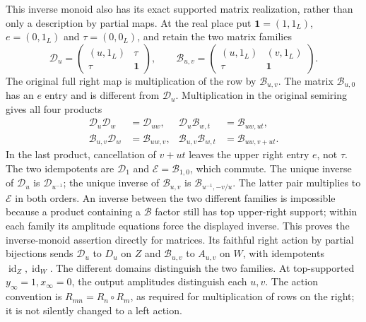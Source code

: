 This inverse monoid also has its exact supported matrix
realization, rather than only a description by partial maps.
At the real place put $\mathbf1=(1,1_L)$,
$e=(0,1_L)$ and $\tau=(0,0_L)$, and retain the two matrix families
\begin{equation}\tag{SAP18a}
\mathcal D_u=
\begin{pmatrix}(u,1_L)&\tau\\ \tau&\mathbf1\end{pmatrix},
\qquad
\mathcal B_{u,v}=
\begin{pmatrix}(u,1_L)&(v,1_L)\\ \tau&\mathbf1\end{pmatrix}.
\end{equation}
The original full right map is multiplication of the row by
$\mathcal B_{u,v}$. The matrix $\mathcal B_{u,0}$ has an $e$
entry and is different from $\mathcal D_u$. Multiplication in
the original semiring gives all four products
\begin{equation}\tag{SAP18b}
\begin{aligned}
\mathcal D_u\mathcal D_w&=\mathcal D_{uw},&
\mathcal D_u\mathcal B_{w,t}&=\mathcal B_{uw,ut},\\
\mathcal B_{u,v}\mathcal D_w&=\mathcal B_{uw,v},&
\mathcal B_{u,v}\mathcal B_{w,t}&=\mathcal B_{uw,v+ut}.
\end{aligned}
\end{equation}
In the last product, cancellation of $v+ut$ leaves the upper
right entry $e$, not $\tau$. The two idempotents are
$\mathcal D_1$ and $\mathcal E=\mathcal B_{1,0}$, which commute.
The unique inverse of $\mathcal D_u$ is $\mathcal D_{u^{-1}}$;
the unique inverse of $\mathcal B_{u,v}$ is
$\mathcal B_{u^{-1},-v/u}$. The latter pair multiplies to
$\mathcal E$ in both orders. An inverse between the two
different families is impossible because a product containing
a $\mathcal B$ factor still has top upper-right support; within
each family its amplitude equations force the displayed inverse.
This proves the inverse-monoid assertion directly for matrices.
Its faithful right action by partial bijections sends
$\mathcal D_u$ to $D_u$ on $Z$ and $\mathcal B_{u,v}$ to
$A_{u,v}$ on $W$, with idempotents
$\operatorname{id}_Z,\operatorname{id}_W$. The different domains
distinguish the two families. At top-supported $y_\infty=1,
x_\infty=0$, the output amplitudes distinguish each $u,v$.
The action convention is $R_{mn}=R_n\circ R_m$, as required
for multiplication of rows on the right; it is not silently
changed to a left action.

